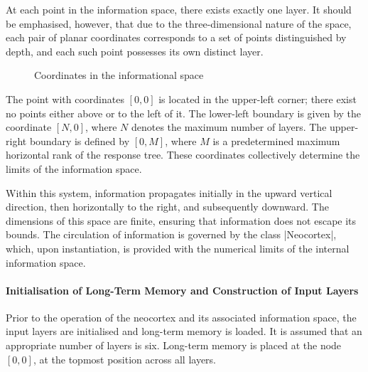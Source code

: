 \documentclass[12pt, a4paper]{article}
\begin{document}
At each point in the information space, there exists exactly one layer. It should be 
emphasised, however, that due to the three-dimensional nature of the space, each pair 
of planar coordinates corresponds to a set of points distinguished by depth, and each 
such point possesses its own distinct layer.

\begin{figure}[h]
\begin{center}
\end{center}
\label{fig:infospace}
\caption{Coordinates in the informational space}
\end{figure}

The point with coordinates $[0,0]$ is located in the upper-left corner; there exist no 
points either above or to the left of it. The lower-left boundary is given by the 
coordinate $[N,0]$, where $N$ denotes the maximum number of layers. The upper-right 
boundary is defined by $[0,M]$, where $M$ is a predetermined maximum horizontal 
rank of the response tree. These coordinates collectively determine the limits of 
the information space.

Within this system, information propagates initially in the upward vertical direction, 
then horizontally to the right, and subsequently downward. The dimensions of this space 
are finite, ensuring that information does not escape its bounds. The circulation of 
information is governed by the class |Neocortex|, which, upon instantiation, is 
provided with the numerical limits of the internal information space.

\paragraph{Initialisation of Long-Term Memory and Construction of Input Layers}

Prior to the operation of the neocortex and its associated information space, the 
input layers are initialised and long-term memory is loaded. It is assumed that an 
appropriate number of layers is six\cite{Neocortex}. Long-term memory is placed at 
the node $[0,0]$, at the topmost position across all layers.
\end{document}
